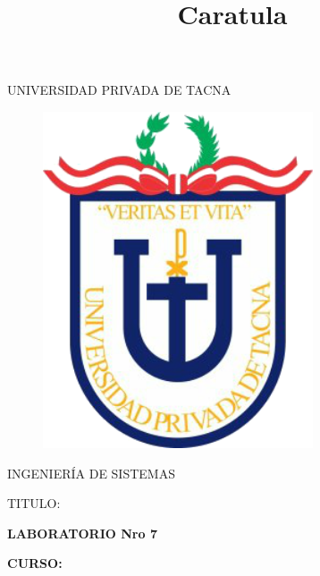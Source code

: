 \documentclass[12pt,letterpaper]{article}
\begin{document}
%


\title{Caratula}

\begin{titlepage}
\begin{center}
\large{UNIVERSIDAD PRIVADA DE TACNA}\\
\vspace*{-0.025in}
\begin{figure}[htb]
\begin{center}
\includegraphics[width=8cm]{./Imagenes/logo}
\end{center}
\end{figure}
\vspace*{0.15in}
INGENIERÍA DE SISTEMAS  \\

\vspace*{0.5in}
\begin{large}
TITULO:\\
\end{large}

\vspace*{0.1in}
\begin{Large}
\textbf{LABORATORIO Nro 7} \\
\end{Large}

\vspace*{0.3in}
\begin{Large}
\textbf{CURSO:} \\
\end{Large}


\end{center}
\end{titlepage}
\end{document}
